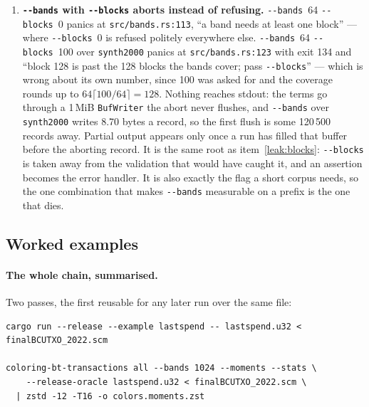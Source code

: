 \documentclass[11pt,a4paper]{article}
\newcommand{\flag}[1]{\texttt{-{}-#1}}
\begin{document}
\begin{enumerate}
        \texttt{-{}-matrix s.mat < records} is refused by name and byte count;
        \texttt{cat records | \ldots\ -{}-matrix s.mat} exits 0 and the piped
        records are read by nothing. The check measures what it can seek over,
        so the case a user is most likely to type at a 150\,GB file --- down a
        pipe --- is the case it cannot see.
  \item \label{leak:abort}\textbf{\flag{bands} with \flag{blocks} aborts instead of refusing.}
        \flag{bands}~64 \flag{blocks}~0 panics at \texttt{src/bands.rs:113},
        ``a band needs at least one block'' --- where \flag{blocks}~0 is refused
        politely everywhere else. \flag{bands}~64 \flag{blocks}~100 over
        \texttt{synth2000} panics at \texttt{src/bands.rs:123} with exit 134 and
        ``block 128 is past the 128 blocks the bands cover; pass \flag{blocks}''
        --- which is wrong about its own number, since 100 was asked for and the
        coverage rounds up to $64\lceil 100/64 \rceil = 128$. Nothing reaches
        stdout: the terms go through a 1\,MiB \texttt{BufWriter} the abort
        never flushes, and \flag{bands} over \texttt{synth2000} writes 8.70
        bytes a record, so the first flush is some 120\,500 records away. Partial
        output appears only once a run has filled that buffer before the
        aborting record. It is the same root as
        item~\ref{leak:blocks}: \flag{blocks} is taken
        away from the validation that would have caught it, and an assertion
        becomes the error handler. It is also
        exactly the flag a short corpus needs, so the one combination that makes
        \flag{bands} measurable on a prefix is the one that dies.
\end{enumerate}

\subsection{Worked examples}

\paragraph{The whole chain, summarised.} Two passes, the first reusable for any
later run over the same file:

\begin{lstlisting}
cargo run --release --example lastspend -- lastspend.u32 < finalBCUTXO_2022.scm

coloring-bt-transactions all --bands 1024 --moments --stats \
    --release-oracle lastspend.u32 < finalBCUTXO_2022.scm \
  | zstd -12 -T16 -o colors.moments.zst
\end{lstlisting}
\end{document}
